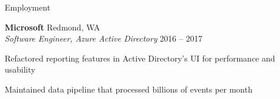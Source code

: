 \documentclass{resume} %
\begin{document}
\begin{grouping}{Employment}

\item {\bf Microsoft } \hfill Redmond, WA \\
    {\em Software Engineer, Azure Active Directory} \hfill 2016 -- 2017
    \begin{items}
        \item Refactored reporting features in Active Directory’s UI for performance and usability
        \item Maintained data pipeline that processed billions of events per month
    \end{items}

\end{grouping}


\end{document}
